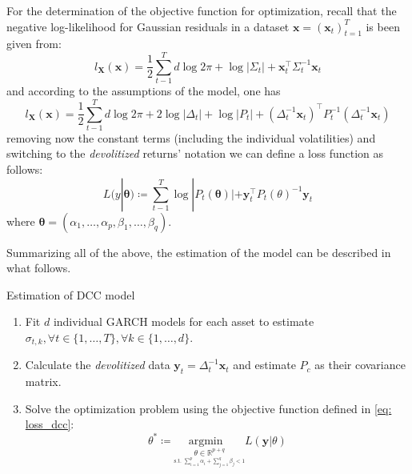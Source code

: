 \documentclass[a4paper, oneside]{discothesis}
\begin{document}
  \begin{mdframed}\begin{remark}\label{fitting CC}
For the determination of the objective function for optimization, recall that the negative log-likelihood for Gaussian residuals in a dataset $\mathbf{x} = (\mathbf{x}_t)_{t=1}^T$ is been given from:
\[l_{\mathbf{X}}(\mathbf{x}) = \frac{1}{2}\sum_{t-1}^T d\log2\pi+\log|\Sigma_t|+\mathbf{x}_t^\intercal\Sigma_t^{-1}\mathbf{x}_t\]
and according to the assumptions of the model, one has
\[l_{\mathbf{X}}(\mathbf{x}) = \frac{1}{2}\sum_{t-1}^T d\log2\pi+2\log|\Delta_t|+\log|P_t|+(\Delta_t^{-1}\mathbf{x}_t)^\intercal P_t^{-1}(\Delta_t^{-1}\mathbf{x}_t)\]
removing now the constant terms (including the individual volatilities) and switching to the \textit{devolitized} returns' notation we can define a loss function as follows:
\begin{equation}\label{eq: loss_dcc}
    L(y| \boldsymbol{\theta}) \coloneqq \sum_{t-1}^T \log|P_t(\boldsymbol{\theta})|+\mathbf{y}_t^\intercal P_t(\theta)^{-1}\mathbf{y}_t
\end{equation}
where $\boldsymbol{\theta} = (\alpha_1, \dots, \alpha_p, \beta_1, \dots, \beta_q)$.
\end{remark}\end{mdframed}  

Summarizing all of the above, the estimation of the model can be described in what follows.
\begin{algorithm}
\caption{Estimation of DCC model}
\begin{algorithmic}
\State\begin{enumerate}
    \item Fit $d$ individual GARCH models for each asset to estimate $\sigma_{t, k}, \forall t\in \{1, \dots, T\},\forall k\in\{1, \dots, d\}$.
    \item Calculate the \textit{devolitized} data $\mathbf{y}_t = \Delta_t^{-1}\mathbf{x}_t$ and estimate $P_c$ as their covariance matrix. 
    \item Solve the optimization problem using the objective function defined in \ref{eq: loss_dcc}:
    \[\theta^*\coloneqq\underset{\underset{\text{s.t. }\sum_{i=1}^p \alpha_i + \sum_{j=1}^q \beta_j<1}{\theta\in\mathbb{R}^{p+q}}}{\mathrm{argmin\text{   }     }}L(\mathbf{y}|\theta)\]
    
    \end{enumerate}
\end{algorithmic}
\end{algorithm}
\end{document}
